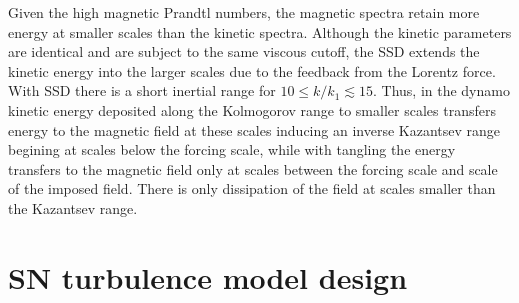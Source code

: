 \documentclass[preprint2]{aastex63}
\newcommand{\ns}[1]{\textcolor{orange}{#1}}
\begin{document}

Given the high magnetic Prandtl numbers, the magnetic spectra retain more energy
at smaller scales than the kinetic spectra.
Although the kinetic parameters are identical and are subject to the same 
viscous cutoff, the SSD extends the kinetic energy into the 
larger scales
due to the feedback from the Lorentz force.
With SSD there is a short inertial range for $10\leq k/k_1\lesssim 15$.
Thus, in the dynamo kinetic energy deposited along the Kolmogorov range to
smaller scales transfers energy to the magnetic field at these scales
inducing an inverse Kazantsev range begining at scales below the forcing
scale, while with tangling the energy transfers to the magnetic field
only at scales between the forcing scale and scale of the imposed field.
There is only dissipation of the field at scales smaller than the Kazantsev 
range.

\section{SN turbulence model design} \label{sec:model}
\end{document}
